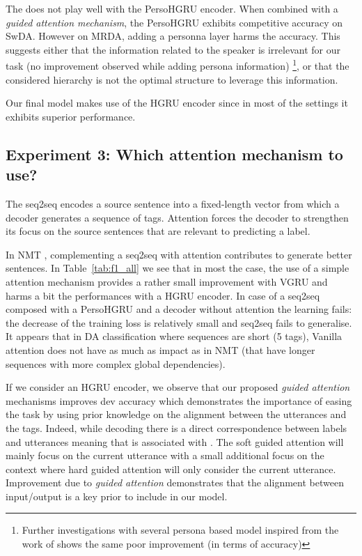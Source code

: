 \documentclass[letterpaper]{article} \usepackage{aaai20}  \usepackage{times}  \usepackage{helvet} \usepackage{courier}  \usepackage[hyphens]{url}  \usepackage{graphicx} \urlstyle{rm} \def\UrlFont{\rm}  \usepackage{graphicx}  \frenchspacing  \setlength{\pdfpagewidth}{8.5in}  \setlength{\pdfpageheight}{11in}
\begin{document}
The  does not play well with the PersoHGRU encoder. When combined with a \textit{guided attention mechanism}, the PersoHGRU exhibits competitive accuracy on SwDA. However on MRDA, adding a personna layer harms the accuracy. This suggests either that the information related to the speaker is irrelevant for our task (no improvement observed while adding persona information) \footnote{Further investigations with several persona based model inspired from the work of \cite{persona_based} shows the same poor improvement (in terms of accuracy)}, or that the considered hierarchy is not the optimal structure to leverage this information. 


Our final model makes use of the HGRU encoder since in most of the settings it exhibits superior performance.




\subsection{Experiment 3: Which attention mechanism to use?}


The seq2seq encodes a source sentence into a fixed-length vector from which a decoder generates a sequence of tags. Attention forces the decoder to strengthen its focus on the source sentences that are relevant to predicting a label.

In NMT \cite{attention}, complementing a seq2seq with attention contributes to generate better sentences. In Table~\ref{tab:f1_all} we see that in most the case, the use of a simple attention mechanism provides a rather small improvement with VGRU and harms a bit the performances with a HGRU encoder. In case of a seq2seq composed with a PersoHGRU and a decoder without attention the learning fails: the decrease of the training loss is relatively small and seq2seq fails to generalise. It appears that in DA classification where sequences are short (5 tags), Vanilla attention does not have as much as impact as in NMT (that have longer sequences with more complex global dependencies). 

If we consider an HGRU encoder, we observe that our proposed \textit{guided attention} mechanisms improves dev accuracy which demonstrates the importance of easing the task by using prior knowledge on the alignment between the utterances and the tags. Indeed, while decoding there is a direct correspondence between labels and utterances meaning that  is associated with . The soft guided attention will mainly focus on the current utterance with a small additional focus on the context where hard guided attention will only consider the current utterance. Improvement due to \textit{guided attention} demonstrates that the alignment between input/output is a key prior to include in our model.
\end{document}
